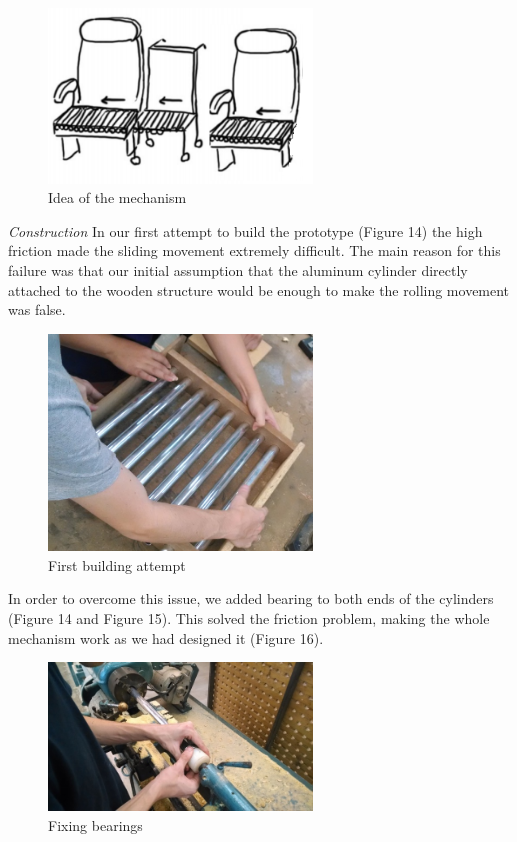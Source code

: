 \begin{figure}[h]
\centering
\includegraphics[width=7cm]{brazil_images/image038.png}
\caption{Idea of the mechanism}
\label{fig:idea_mechanism}
\end{figure}

\emph{Construction}
In our first attempt to build the prototype (Figure 14) the high friction made the sliding movement extremely difficult. The main reason for this failure was that our initial assumption that the aluminum cylinder directly attached to the wooden structure would be enough to make the rolling movement was false. \\

\begin{figure}[h]
\centering
\includegraphics[width=7cm]{brazil_images/image039.jpg}
\caption{First building attempt}
\label{fig:first_attempt}
\end{figure}

In order to overcome this issue, we added bearing to both ends of the cylinders (Figure 14 and Figure 15). This solved the friction problem, making the whole mechanism work as we had designed it (Figure 16).	

\begin{figure}[h]
\centering
\includegraphics[width=7cm]{brazil_images/image040.jpg}
\caption{Fixing bearings}
\label{fig:fixing_bearings}
\end{figure}


